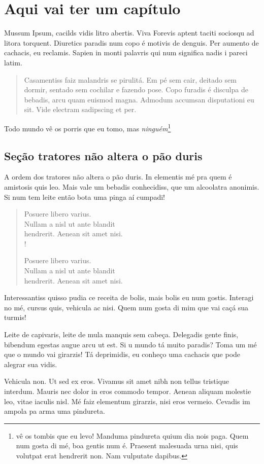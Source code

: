 \chapter{Aqui vai ter um capítulo}

Mussum Ipsum, cacilds vidis litro abertis. Viva Forevis aptent taciti sociosqu ad litora torquent. Diuretics paradis num copo é motivis de denguis. Per aumento de cachacis, eu reclamis. Sapien in monti palavris qui num significa nadis i pareci latim.  

\begin{quote}
Casamentiss faiz malandris se pirulitá. Em pé sem cair, deitado sem dormir, sentado sem cochilar e fazendo pose. Copo furadis é disculpa de bebadis, arcu quam euismod magna. Admodum accumsan disputationi eu sit. Vide electram sadipscing et per.
\end{quote}

Todo mundo vê os porris que eu tomo, mas \textit{ninguém}\footnote{ vê os tombis que eu levo! Manduma pindureta quium dia nois paga. Quem num gosta di mé, boa gentis num é. Praesent malesuada urna nisi, quis volutpat erat hendrerit non. Nam vulputate dapibus.}

\section{Seção tratores não altera o pão duris}
A ordem dos tratores não altera o pão duris. In elementis mé pra quem é amistosis quis leo. Mais vale um bebadis conhecidiss, que um alcoolatra anonimis. Si num tem leite então bota uma pinga aí cumpadi!

\begin{verse}
Posuere libero varius. \\
Nullam a nisl ut ante blandit \\
hendrerit. Aenean sit amet nisi. \\!

Posuere libero varius. \\
Nullam a nisl ut ante blandit \\
hendrerit. Aenean sit amet nisi. \\
\end{verse}

Interessantiss quisso pudia ce receita de bolis, mais bolis eu num gostis. Interagi no mé, cursus quis, vehicula ac nisi. Quem num gosta di mim que vai caçá sua turmis!

Leite de capivaris, leite de mula manquis sem cabeça. Delegadis gente finis, bibendum egestas augue arcu ut est. Si u mundo tá muito paradis? Toma um mé que o mundo vai girarzis! Tá deprimidis, eu conheço uma cachacis que pode alegrar sua vidis.

Vehicula non. Ut sed ex eros. Vivamus sit amet nibh non tellus tristique interdum. Mauris nec dolor in eros commodo tempor. Aenean aliquam molestie leo, vitae iaculis nisl. Mé faiz elementum girarzis, nisi eros vermeio. Cevadis im ampola pa arma uma pindureta.